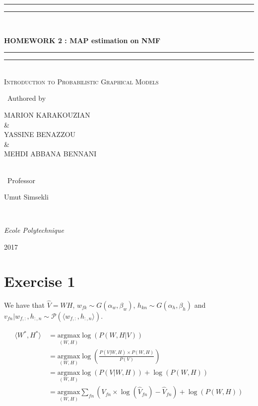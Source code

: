 \documentclass[a4paper,12pt]{article} %
\newlength{\drop}
\begin{document}
\begin{center}
    \textheight
    \centering
    \vspace*{\baselineskip}
    \rule{\textwidth}{1.6pt}\vspace*{-\baselineskip}\vspace*{2pt}
    \rule{\textwidth}{0.4pt}\\[\baselineskip]
    {\huge {\textbf{HOMEWORK 2 : MAP estimation on NMF}}
    \rule{\textwidth}{0.4pt}\vspace*{-\baselineskip}\vspace{3.2pt}
    \rule{\textwidth}{1.6pt}\\[\baselineskip]
    \vspace*{\baselineskip}
    \scshape
    Introduction to Probabilistic Graphical Models   \par
    \vspace*{2\baselineskip}\
    Authored by \\[\baselineskip]
    {\Large MARION KARAKOUZIAN \\ \& \\
    YASSINE BENAZZOU \\ \& \\
    MEHDI ABBANA BENNANI \par}\ \\
    \vspace*{\baselineskip}\
    Professor \\
    {\Large Umut Simsekli  \par}\ \\
    {\itshape Ecole Polytechnique \par}
    \vfill
    {\scshape 2017} \        \par
}  \end{center}
  
\newpage

\section{Exercise 1}
We have that $\hat{V}=WH$, $w_{fk} \sim G(\alpha_w,\beta_w)$, $h_{kn} \sim G(\alpha_h,\beta_h)$ and $v_{fn}|w_{f,:},h_{:,n} \sim \mathcal{P}(\langle w_{f,:},h_{:,n}\rangle)$. 

\begin{align*}
\langle W^*,H^*\rangle \: &= \underset{(W,H)}{\mathrm{argmax}} \log (P(W,H|V))\\
&= \underset{(W,H)}{\mathrm{argmax}} \log (\frac{P(V|W,H)\times P(W,H)}{P(V)}) \\
&= \underset{(W,H)}{\mathrm{argmax}} \log (P(V|W,H))+\log (P(W,H))\\
&= \underset{(W,H)}{\mathrm{argmax}} \sum\limits_{fn}\left( V_{fn}\times \log(\hat{V}_{fn}) - \hat{V}_{fn}\right) + \log (P(W,H))
\end{align*}
\end{document}
